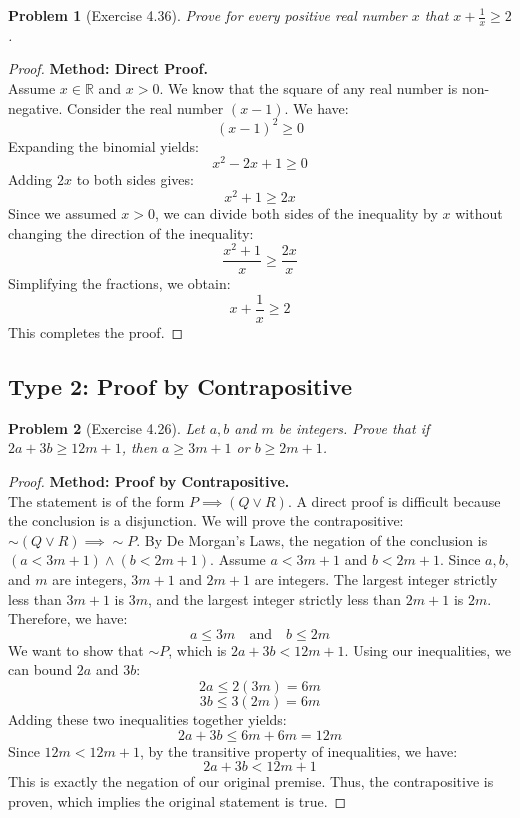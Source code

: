 \documentclass[11pt]{article}
\newtheorem{problem}{Problem}
\newcommand{\R}{\mathbb{R}}
\begin{document}
\begin{problem}[Exercise 4.36]
Prove for every positive real number $x$ that $x + \frac{1}{x} \ge 2$.
\end{problem}
\begin{proof}
\textbf{Method: Direct Proof.} \\
Assume $x \in \R$ and $x > 0$. We know that the square of any real number is non-negative. Consider the real number $(x - 1)$. We have:
\[ (x - 1)^2 \ge 0 \]
Expanding the binomial yields:
\[ x^2 - 2x + 1 \ge 0 \]
Adding $2x$ to both sides gives:
\[ x^2 + 1 \ge 2x \]
Since we assumed $x > 0$, we can divide both sides of the inequality by $x$ without changing the direction of the inequality:
\[ \frac{x^2 + 1}{x} \ge \frac{2x}{x} \]
Simplifying the fractions, we obtain:
\[ x + \frac{1}{x} \ge 2 \]
This completes the proof.
\end{proof}

\subsection{Type 2: Proof by Contrapositive}

\begin{problem}[Exercise 4.26]
Let $a, b$ and $m$ be integers. Prove that if $2a + 3b \ge 12m + 1$, then $a \ge 3m + 1$ or $b \ge 2m + 1$.
\end{problem}
\begin{proof}
\textbf{Method: Proof by Contrapositive.} \\
The statement is of the form $P \implies (Q \lor R)$. A direct proof is difficult because the conclusion is a disjunction. We will prove the contrapositive: $\sim(Q \lor R) \implies \sim P$.
By De Morgan's Laws, the negation of the conclusion is $(a < 3m + 1) \land (b < 2m + 1)$. 
Assume $a < 3m + 1$ and $b < 2m + 1$. 
Since $a, b,$ and $m$ are integers, $3m+1$ and $2m+1$ are integers. The largest integer strictly less than $3m+1$ is $3m$, and the largest integer strictly less than $2m+1$ is $2m$. Therefore, we have:
\[ a \le 3m \quad \text{and} \quad b \le 2m \]
We want to show that $\sim P$, which is $2a + 3b < 12m + 1$.
Using our inequalities, we can bound $2a$ and $3b$:
\[ 2a \le 2(3m) = 6m \]
\[ 3b \le 3(2m) = 6m \]
Adding these two inequalities together yields:
\[ 2a + 3b \le 6m + 6m = 12m \]
Since $12m < 12m + 1$, by the transitive property of inequalities, we have:
\[ 2a + 3b < 12m + 1 \]
This is exactly the negation of our original premise. Thus, the contrapositive is proven, which implies the original statement is true.
\end{proof}
\end{document}

